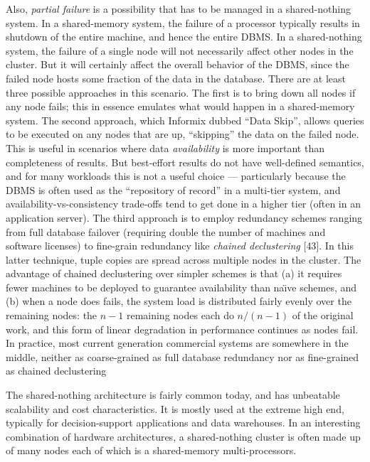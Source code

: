 \documentclass[b5paper,11pt,twoside,openright]{book}
\begin{document}
Also, \emph{partial failure} is a possibility that has to be managed in
a shared-nothing system. In a shared-memory system, the failure of a
processor typically results in shutdown of the entire machine, and hence
the entire DBMS. In a shared-nothing system, the failure of a single
node will not necessarily affect other nodes in the cluster. But it will
certainly affect the overall behavior of the DBMS, since the failed node
hosts some fraction of the data in the database. There are at least
three possible approaches in this scenario. The first is to bring down
all nodes if any node fails; this in essence emulates what would happen
in a shared-memory system. The second approach, which Informix dubbed
``Data Skip'', allows queries to be executed on any nodes that are up,
``skipping'' the data on the failed node. This is useful in scenarios
where data \emph{availability} is more important than completeness of
results. But best-effort results do not have well-defined semantics, and
for many workloads this is not a useful choice --- particularly because
the DBMS is often used as the ``repository of record'' in a multi-tier
system, and availability-vs-consistency trade-offs tend to get done in a
higher tier (often in an application server). The third approach is to
employ redundancy schemes ranging from full database failover (requiring
double the number of machines and software licenses) to fine-grain
redundancy like \emph{chained declustering} {[}43{]}. In this latter
technique, tuple copies are spread across multiple nodes in the cluster.
The advantage of chained declustering over simpler schemes is that (a)
it requires fewer machines to be deployed to guarantee availability than
na{\"\i}ve schemes, and (b) when a node does fails, the system load is
distributed fairly evenly over the remaining nodes: the $n - 1$
remaining nodes each do $n / (n - 1)$ of the
original work, and this form of linear degradation in performance
continues as nodes fail. In practice, most current generation commercial
systems are somewhere in the middle, neither as coarse-grained as full
database redundancy nor as fine-grained as chained declustering

The shared-nothing architecture is fairly common today, and has
unbeatable scalability and cost characteristics. It is mostly used at
the extreme high end, typically for decision-support applications and
data warehouses. In an interesting combination of hardware
architectures, a shared-nothing cluster is often made up of many nodes
each of which is a shared-memory multi-processors.
\end{document}
